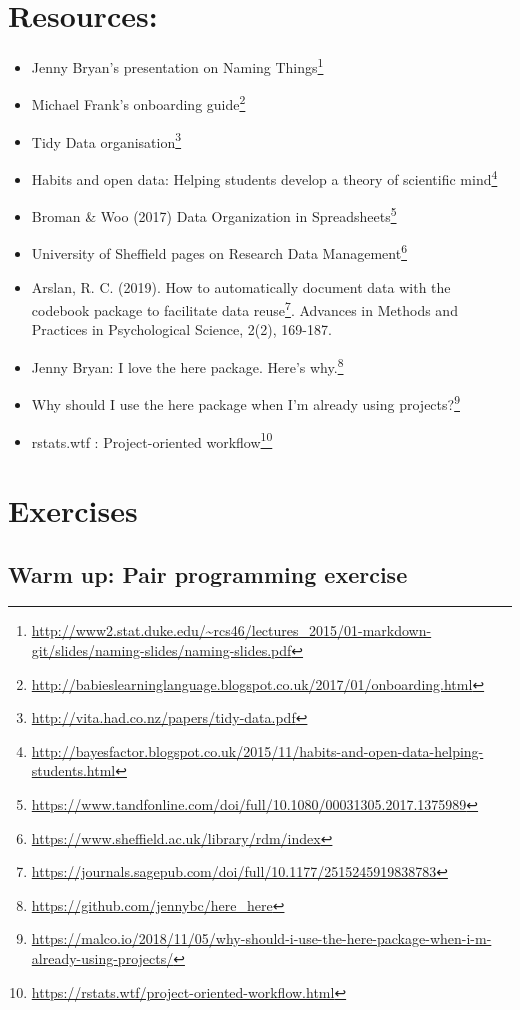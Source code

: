 \documentclass[
  12pt,
  a5paper,
]{book}
\DeclareRobustCommand{\href}[2]{#2\footnote{\url{#1}}}
\providecommand{\tightlist}{%
  \setlength{\itemsep}{0pt}\setlength{\parskip}{0pt}}
\begin{document}
\hypertarget{resources-3}{%
\section{Resources:}\label{resources-3}}

\begin{itemize}
\tightlist
\item
  Jenny Bryan's presentation on \href{http://www2.stat.duke.edu/~rcs46/lectures_2015/01-markdown-git/slides/naming-slides/naming-slides.pdf}{Naming Things}
\item
  \href{http://babieslearninglanguage.blogspot.co.uk/2017/01/onboarding.html}{Michael Frank's onboarding guide}
\item
  \href{http://vita.had.co.nz/papers/tidy-data.pdf}{Tidy Data organisation}
\item
  \href{http://bayesfactor.blogspot.co.uk/2015/11/habits-and-open-data-helping-students.html}{Habits and open data: Helping students develop a theory of scientific mind}
\item
  Broman \& Woo (2017) \href{https://www.tandfonline.com/doi/full/10.1080/00031305.2017.1375989}{Data Organization in Spreadsheets}
\item
  \href{https://www.sheffield.ac.uk/library/rdm/index}{University of Sheffield pages on Research Data Management}
\item
  Arslan, R. C. (2019). \href{https://journals.sagepub.com/doi/full/10.1177/2515245919838783}{How to automatically document data with the codebook package to facilitate data reuse}. Advances in Methods and Practices in Psychological Science, 2(2), 169-187.
\item
  Jenny Bryan: \href{https://github.com/jennybc/here_here}{I love the here package. Here's why.}
\item
  \href{https://malco.io/2018/11/05/why-should-i-use-the-here-package-when-i-m-already-using-projects/}{Why should I use the here package when I'm already using projects?}
\item
  rstats.wtf : \href{https://rstats.wtf/project-oriented-workflow.html}{Project-oriented workflow}
\end{itemize}

\hypertarget{exercises-1}{%
\section{Exercises}\label{exercises-1}}

\hypertarget{warm-up-pair-programming-exercise}{%
\subsection{Warm up: Pair programming exercise}\label{warm-up-pair-programming-exercise}}
\end{document}
